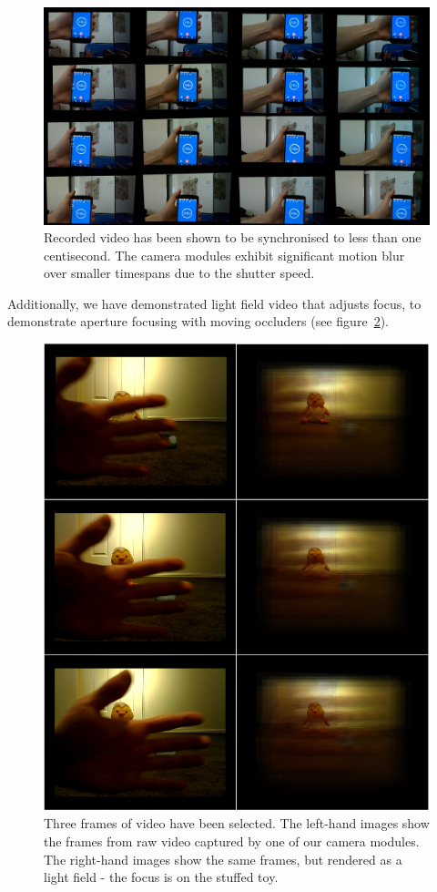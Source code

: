 \documentclass[../main.tex]{subfiles}
\begin{document}
\begin{figure}[H]
    \centering
    \includegraphics[width=\linewidth]{images/video-sync}
    \caption{Recorded video has been shown to be synchronised to less than one centisecond. The camera modules exhibit  significant motion blur over smaller timespans due to the shutter speed.}
    \label{fig:video-sync}
\end{figure}

Additionally, we have demonstrated light field video that adjusts focus, to demonstrate aperture focusing with moving occluders (see figure~\ref{fig:video-frames}).

\begin{figure}[H]
    \centering
    \includegraphics[width=\linewidth]{images/video-frames}
    \caption{Three frames of video have been selected. The left-hand images show the frames from raw video captured by one of our camera modules. The right-hand images show the same frames, but rendered as a light field - the focus is on the stuffed toy.}
    \label{fig:video-frames}
\end{figure}

\newpage
\end{document}
